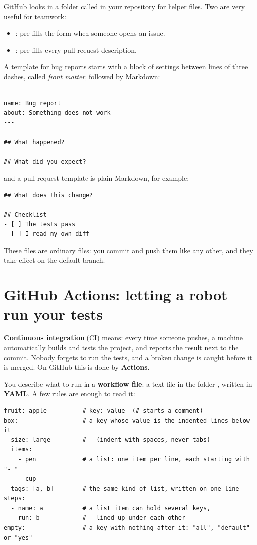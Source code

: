 GitHub looks in a folder called  in your repository for helper files. Two are very useful for teamwork:

\begin{itemize}
  \item {}: pre-fills the form when someone opens an issue.
  \item {}: pre-fills every pull request description.
\end{itemize}

A template for bug reports starts with a block of settings between lines of three dashes, called \emph{front matter}, followed by Markdown:

\begin{lstlisting}
---
name: Bug report
about: Something does not work
---

## What happened?

## What did you expect?
\end{lstlisting}

and a pull-request template is plain Markdown, for example:

\begin{lstlisting}
## What does this change?

## Checklist
- [ ] The tests pass
- [ ] I read my own diff
\end{lstlisting}

These files are ordinary files: you commit and push them like any other, and they take effect on the default branch.

\section{GitHub Actions: letting a robot run your tests}

\textbf{Continuous integration} (CI) means: every time someone pushes, a machine automatically builds and tests the project, and reports the result next to the commit. Nobody forgets to run the tests, and a broken change is caught before it is merged. On GitHub this is done by \textbf{Actions}.

You describe what to run in a \textbf{workflow file}: a text file in the folder , written in \textbf{YAML}. A few rules are enough to read it:

\begin{lstlisting}
fruit: apple          # key: value  (# starts a comment)
box:                  # a key whose value is the indented lines below it
  size: large         #   (indent with spaces, never tabs)
  items:
    - pen             # a list: one item per line, each starting with "- "
    - cup
  tags: [a, b]        # the same kind of list, written on one line
steps:
  - name: a           # a list item can hold several keys,
    run: b            #   lined up under each other
empty:                # a key with nothing after it: "all", "default" or "yes"
\end{lstlisting}

